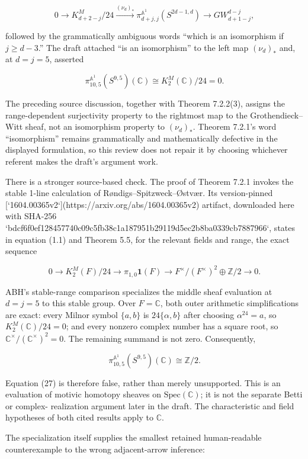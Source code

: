 \documentclass[11pt]{article}
\begin{document}
\begin{markdown}
$$
 0 \longrightarrow K^M_{d+2-j}/24
 \xrightarrow{(\nu_d)_*}
 \pi^{\mathbb A^1}_{d+j,j}(S^{2d-1,d})
 \longrightarrow GW^{d-j}_{d+1-j},
$$

followed by the grammatically ambiguous words “which is an isomorphism if
$j\geq d-3$.” The draft attached “is an isomorphism” to the left map $(\nu_d)_*$ and, at
$d=j=5$, asserted

$$
 \pi^{\mathbb A^1}_{10,5}(S^{9,5})(\mathbb C)
 \cong K^M_2(\mathbb C)/24 = 0.
$$

The preceding source discussion, together with Theorem 7.2.2(3), assigns the range-dependent
surjectivity property to the rightmost map to the Grothendieck--Witt sheaf, not an isomorphism
property to $(\nu_d)_*$. Theorem 7.2.1's word “isomorphism” remains grammatically and
mathematically defective in the displayed formulation, so this review does not repair it by
choosing whichever referent makes the draft's argument work.

There is a stronger source-based check. The proof of Theorem 7.2.1 invokes the stable 1-line
calculation of Røndigs--Spitzweck--Østvær. Its version-pinned
[`1604.00365v2`](https://arxiv.org/abs/1604.00365v2) artifact, downloaded here with SHA-256
`bdcf6f0ef128457740c09c5fb38c1a187951b29119d5ec2b8ba0339cb7887966`, states in equation (1.1)
and Theorem 5.5, for the relevant fields and range, the exact sequence

$$
 0 \longrightarrow K^M_2(F)/24
 \longrightarrow \pi_{1,0}\mathbf 1(F)
 \longrightarrow F^\times/(F^\times)^2 \oplus \mathbb Z/2
 \longrightarrow 0.
$$

ABH's stable-range comparison specializes the middle sheaf evaluation at $d=j=5$ to this stable
group. Over $F=\mathbb C$, both outer arithmetic simplifications are exact: every Milnor symbol
$\{a,b\}$ is $24\{\alpha,b\}$ after choosing $\alpha^{24}=a$, so
$K^M_2(\mathbb C)/24=0$; and every nonzero complex number has a square root, so
$\mathbb C^\times/(\mathbb C^\times)^2=0$. The remaining summand is not zero. Consequently,

$$
 \pi^{\mathbb A^1}_{10,5}(S^{9,5})(\mathbb C) \cong \mathbb Z/2.
$$

Equation (27) is therefore false, rather than merely unsupported. This is an evaluation of motivic
homotopy sheaves on $\mathrm{Spec}(\mathbb C)$; it is not the separate Betti or complex-
realization argument later in the draft. The characteristic and field hypotheses of both cited
results apply to $\mathbb C$.

The specialization itself supplies the smallest retained human-readable counterexample to the
wrong adjacent-arrow inference:


\end{markdown}
\end{document}
